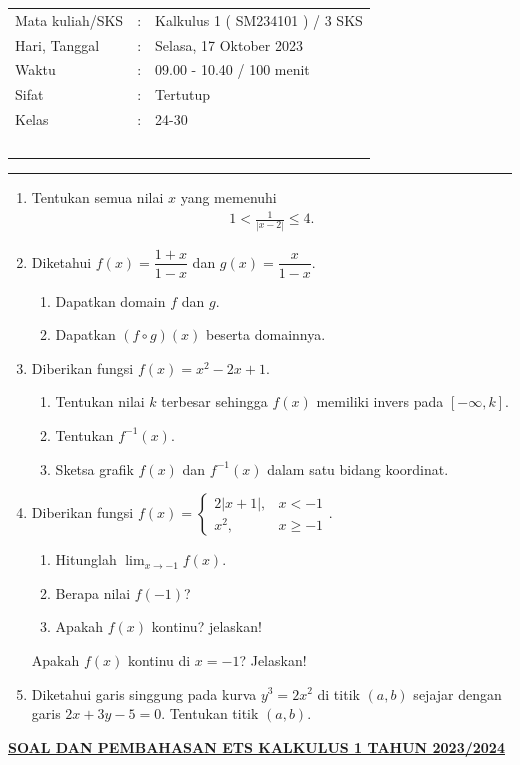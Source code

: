 \documentclass[10pt,openany,a4paper]{article}
\theoremstyle{definition}
\theoremstyle{definition}
\theoremstyle{plain}
\begin{document}
    \begin{center}
	\begin{tabular}{lcl}
		Mata kuliah/SKS & : & Kalkulus 1 ( SM234101 ) / 3 SKS\\
		Hari, Tanggal & : & Selasa, 17 Oktober 2023\\
		Waktu & : & 09.00 - 10.40 / 100 menit\\
		Sifat & : & Tertutup\\
		Kelas & : & 24-30\\
  ~
	\end{tabular}

    \noindent\rule{\textwidth}{2.pt}
        \end{center}
    \begin{enumerate}
    \item Tentukan semua nilai $x$ yang memenuhi
    \begin{align*}
        1<\frac{1}{|x-2|}\leq 4.
    \end{align*}

    \item Diketahui $f(x)=\dfrac{1+x}{1-x}$ dan $g(x)=\dfrac{x}{1-x}$.
    \begin{enumerate}
        \item Dapatkan domain $f$ dan $g$.
        \item Dapatkan $(f\circ g)(x)$ beserta domainnya.
    \end{enumerate}

    \item Diberikan fungsi $f(x)=x^2-2x+1$.
    \begin{enumerate}
        \item Tentukan nilai $k$ terbesar sehingga $f(x)$ memiliki invers pada $[-\infty,k]$.
        \item Tentukan $f^{-1}(x)$.
        \item Sketsa grafik $f(x)$ dan $f^{-1}(x)$ dalam satu bidang koordinat.
    \end{enumerate}

    \item Diberikan fungsi $f(x)=\begin{cases}
        2|x+1|, & x<-1\\
        x^2, & x\geq -1
    \end{cases}$.
    \begin{enumerate}
        \item Hitunglah $\displaystyle\lim_{x\to-1}f(x)$.
        \item Berapa nilai $f(-1)$?
        \item Apakah $f(x)$ kontinu? jelaskan!
    \end{enumerate}
    Apakah $f(x)$ kontinu di $x=-1$? Jelaskan!

    \item Diketahui garis singgung pada kurva $y^3=2x^2$ di titik $(a,b)$ sejajar dengan garis $2x+3y-5=0$. Tentukan titik $(a,b)$.
\end{enumerate}
\newpage
 \begin{center}
	{\underline{\textbf{\MakeUppercase{Soal dan Pembahasan ETS Kalkulus 1 Tahun 2023/2024}}}}
    \end{center}
\end{document}
